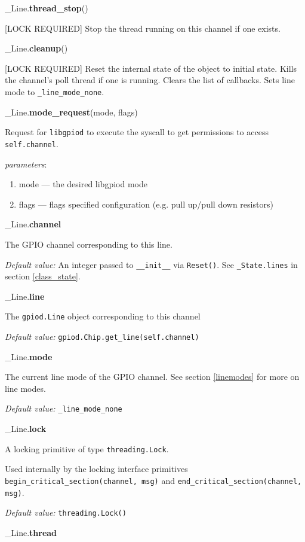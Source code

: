 \documentclass[12pt]{article}
\begin{document}
\noindent \_Line.\textbf{thread\_stop}()

[LOCK REQUIRED] Stop the thread running on this channel if one exists.

\noindent \_Line.\textbf{cleanup}()
      
[LOCK REQUIRED] Reset the internal state of the object to initial state. Kills the channel's poll thread if one is running. Clears the list of callbacks. Sets line mode to \texttt{\_line\_mode\_none}.

\noindent \_Line.\textbf{mode\_request}(mode, flags)

Request for \texttt{libgpiod} to execute the syscall to get permissions to access \texttt{self.channel}.

\textit{parameters}:
\begin{enumerate}
        \item mode --- the desired libgpiod mode
        \item flags --- flags specified configuration (e.g. pull up/pull down resistors)
\end{enumerate}

\noindent \_Line.\textbf{channel}

The GPIO channel corresponding to this line.

\textit{Default value:} An integer passed to \texttt{\_\_init\_\_} via \texttt{Reset()}.
See \texttt{\_State.lines} in section \ref{class_state}.

\noindent \_Line.\textbf{line}

The \texttt{gpiod.Line} object corresponding to this channel

\textit{Default value:} \texttt{gpiod.Chip.get\_line(self.channel)}

\noindent \_Line.\textbf{mode}

The current line mode of the GPIO channel. See section \ref{linemodes} for more on line modes.

\textit{Default value:} \texttt{\_line\_mode\_none}

\noindent \_Line.\textbf{lock}

A locking primitive of type \texttt{threading.Lock}.

Used internally by the locking interface primitives
\texttt{begin\_critical\_section(channel, msg)} and
\texttt{end\_critical\_section(channel, msg)}.

\textit{Default value:} \texttt{threading.Lock()}

\noindent \_Line.\textbf{thread}
\end{document}
